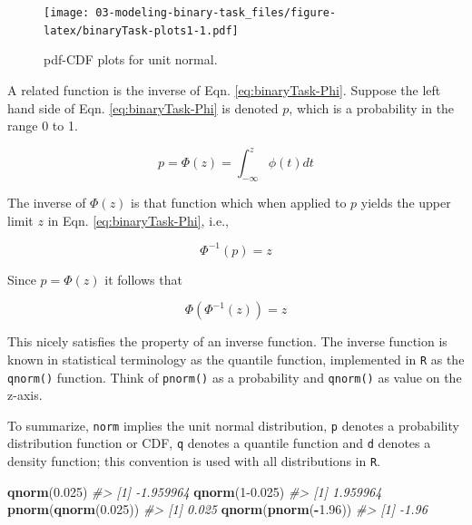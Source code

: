 \documentclass[
]{book}
\newenvironment{Shaded}{\begin{snugshade}}{\end{snugshade}}
\newcommand{\CommentTok}[1]{\textcolor[rgb]{0.56,0.35,0.01}{\textit{#1}}}
\newcommand{\DecValTok}[1]{\textcolor[rgb]{0.00,0.00,0.81}{#1}}
\newcommand{\FloatTok}[1]{\textcolor[rgb]{0.00,0.00,0.81}{#1}}
\newcommand{\KeywordTok}[1]{\textcolor[rgb]{0.13,0.29,0.53}{\textbf{#1}}}
\newcommand{\NormalTok}[1]{#1}
\newcommand{\OperatorTok}[1]{\textcolor[rgb]{0.81,0.36,0.00}{\textbf{#1}}}
\begin{document}
\begin{figure}
\centering
\texttt{[image: 03-modeling-binary-task\_files/figure-latex/binaryTask-plots1-1.pdf]}
\caption{\label{fig:binaryTask-plots1}pdf-CDF plots for unit normal.}
\end{figure}

A related function is the inverse of Eqn. \eqref{eq:binaryTask-Phi}. Suppose the left hand side of Eqn. \eqref{eq:binaryTask-Phi} is denoted \(p\), which is a probability in the range 0 to 1.

\begin{equation} 
p=\Phi\left ( z \right )=\int_{-\infty }^{z}\phi(t)dt
\label{eq:binaryTask-Phi2}
\end{equation}

The inverse of \(\Phi(z)\) is that function which when applied to \(p\) yields the upper limit \(z\) in Eqn. \eqref{eq:binaryTask-Phi}, i.e.,

\begin{equation} 
\Phi^{-1}(p) = z
\label{eq:binaryTask-PhiInvDef}
\end{equation}

Since \(p=\Phi(z)\) it follows that

\begin{equation} 
\Phi(\Phi^{-1}(z))=z
\label{eq:binaryTask-PhiInvDef2}
\end{equation}

This nicely satisfies the property of an inverse function. The inverse function is known in statistical terminology as the quantile function, implemented in \texttt{R} as the \texttt{qnorm()} function. Think of \texttt{pnorm()} as a probability and \texttt{qnorm()} as value on the z-axis.

To summarize, \texttt{norm} implies the unit normal distribution, \texttt{p} denotes a probability distribution function or CDF, \texttt{q} denotes a quantile function and \texttt{d} denotes a density function; this convention is used with all distributions in \texttt{R}.

\begin{Shaded}
\begin{Highlighting}[]
\KeywordTok{qnorm}\NormalTok{(}\FloatTok{0.025}\NormalTok{)}
\CommentTok{\#\textgreater{} [1] {-}1.959964}
\KeywordTok{qnorm}\NormalTok{(}\DecValTok{1}\FloatTok{{-}0.025}\NormalTok{)}
\CommentTok{\#\textgreater{} [1] 1.959964}
\KeywordTok{pnorm}\NormalTok{(}\KeywordTok{qnorm}\NormalTok{(}\FloatTok{0.025}\NormalTok{))}
\CommentTok{\#\textgreater{} [1] 0.025}
\KeywordTok{qnorm}\NormalTok{(}\KeywordTok{pnorm}\NormalTok{(}\OperatorTok{{-}}\FloatTok{1.96}\NormalTok{))}
\CommentTok{\#\textgreater{} [1] {-}1.96}
\end{Highlighting}
\end{Shaded}
\end{document}
